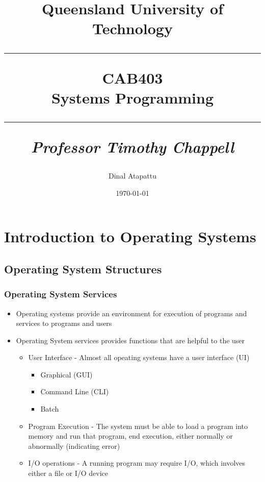 \documentclass[oneside]{book}
\begin{document}
\pagestyle{fancy}
    \fancyhf{}
\fancyhead[R]{\nouppercase{\leftmark}}
\renewcommand{\footrulewidth}{0.4pt}
    \title{
            Queensland University of Technology\\
            \rule{\linewidth}{0.5pt}
        \centering
        \textbf{CAB403} \\
        Systems Programming\\
        \vspace{0.4cm}
        \rule{\linewidth}{1.5pt}
        \small{\textit{Professor Timothy Chappell}}
    }
    \author{Dinal Atapattu}
    \date{\today}
    \maketitle
    \tableofcontents
    \chapter{Introduction to Operating Systems}
        \section{Operating System Structures}
            \subsection{Operating System Services}
                \begin{itemize}
                    \item Operating systems provide an environment for execution of programs and services to programs
                    and users
                    \item Operating System services provides functions that are helpful to the user
                        \begin{itemize}
                            \item User Interface - Almost all opeating systems have a user interface (UI)
                            \begin{itemize}
                                \item Graphical (GUI)
                                \item Command Line (CLI)
                                \item Batch
                            \end{itemize}
                            \item Program Execution - The system must be able to load a program into memory and run that
                            program, end execution, either normally or abnormally (indicating error)
                            \item I/O operations - A running program may require I/O, which involves either a file or I/O device
                        \end{itemize}
                \end{itemize}
\end{document}
